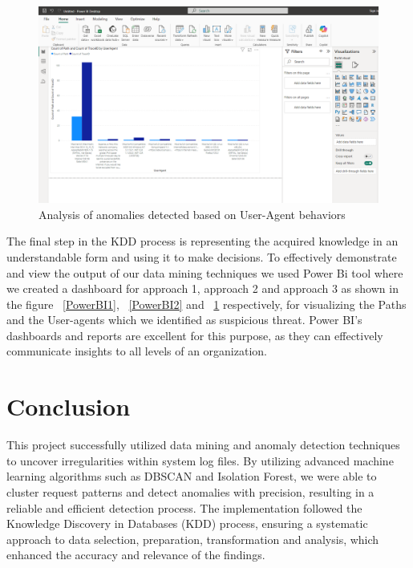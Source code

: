 \begin{figure}
	\begin{center}
		\includegraphics[width=0.7\linewidth]{Images/PowerBI3.png}
		\caption{Analysis of anomalies detected based on User-Agent behaviors}
		\label{PowerBI3} 
	\end{center}
\end{figure}

The final step in the KDD process is representing the acquired knowledge in an understandable form and using it to make decisions. To effectively demonstrate and view the output of our data mining techniques we used Power Bi tool where we created a dashboard for approach 1, approach 2 and approach 3 as shown in the figure ~\ref{PowerBI1}, ~\ref{PowerBI2} and ~\ref{PowerBI3} respectively, for visualizing the Paths and the User-agents which we identified as suspicious threat. Power BI's dashboards and reports are excellent for this purpose, as they can effectively communicate insights to all levels of an organization.

\section{Conclusion}
This project successfully utilized data mining and anomaly detection techniques to uncover irregularities within system log files. By utilizing advanced machine learning algorithms such as DBSCAN and Isolation Forest, we were able to cluster request patterns and detect anomalies with precision, resulting in a reliable and efficient detection process. The implementation followed the Knowledge Discovery in Databases (KDD) process, ensuring a systematic approach to data selection, preparation,  transformation and analysis, which enhanced the accuracy and relevance of the findings.
